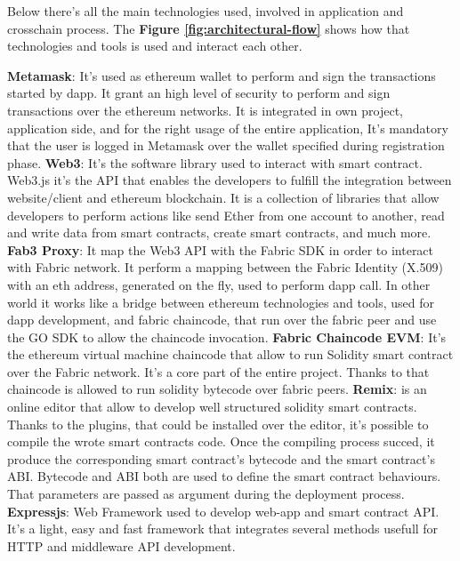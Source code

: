 Below there's all the main technologies used, involved in application and crosschain process.
The \textbf{Figure \ref{fig:architectural-flow}} shows how that technologies and tools is used and
interact each other. 

\begin{outline}
    \1 \textbf{Metamask}: It's used as ethereum wallet to perform and sign the transactions started by dapp.
    It grant an high level of security to perform and sign transactions over the ethereum networks. It is 
    integrated in own project, application side, and for the right usage of the entire application, It's
    mandatory that the user is logged in Metamask over the wallet specified during registration phase.  
    \1 \textbf{Web3}: It's the software library used to interact with smart contract.
    Web3.js it's the API that enables the developers to fulfill the integration between website/client and ethereum blockchain.
    It is a collection of libraries that allow developers to perform actions like send Ether from one account to another, read 
    and write data from smart contracts, create smart contracts, and much more. 
    \1 \textbf{Fab3 Proxy}: It map the Web3 API with the Fabric SDK in order to interact with
    Fabric network. It perform a mapping between the Fabric Identity (X.509) with an eth address, generated on the fly,
    used to perform dapp call. In other world it works like a bridge between ethereum technologies and tools, used 
    for dapp development, and fabric chaincode, that run over the fabric peer and use the GO SDK to allow 
    the chaincode invocation.  
    \1 \textbf{Fabric Chaincode EVM}: It's the ethereum virtual machine chaincode that allow to run Solidity smart contract
    over the Fabric network. It's a core part of the entire project. Thanks to that chaincode is
    allowed to run solidity bytecode over fabric peers.
    \1 \textbf{Remix}: is an online editor that allow to develop well structured solidity smart contracts.
    Thanks to the plugins, that could be installed over the editor, it's possible to compile the wrote
    smart contracts code. Once the compiling process succed, it produce the corresponding smart contract's bytecode
    and the smart contract's ABI. Bytecode and ABI both are used to define the smart contract behaviours. 
    That parameters are passed as argument during the deployment process. 
    \1 \textbf{Expressjs}: Web Framework used to develop web-app and smart contract API.
    It's a light, easy and fast framework that integrates several methods usefull for HTTP and middleware API development. 

\end{outline}
